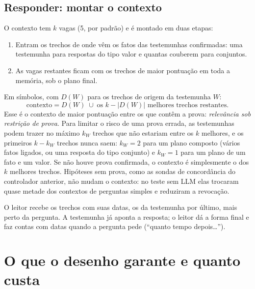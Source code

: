 \documentclass[11pt]{article}
\begin{document}
\subsection{Responder: montar o contexto}

O contexto tem $k$ vagas (5, por padrão) e é montado em duas etapas:
\begin{enumerate}[leftmargin=*,itemsep=1pt]
\item Entram os trechos de onde vêm os fatos das testemunhas confirmadas: uma
  testemunha para respostas do tipo valor e quantas couberem para conjuntos.
\item As vagas restantes ficam com os trechos de maior pontuação em toda a
  memória, sob o plano final.
\end{enumerate}
Em símbolos, com $D(W)$ para os trechos de origem da testemunha $W$:
\begin{equation}
\label{eq:contexto}
\text{contexto}=D(W)\;\cup\;\text{os } k-|D(W)| \text{ melhores trechos restantes}.
\end{equation}
Esse é o contexto de maior pontuação entre os que contêm a prova:
\emph{relevância sob restrição de prova}. Para limitar o risco de uma prova
errada, as testemunhas podem trazer no máximo $k_W$ trechos que não estariam
entre os $k$ melhores, e os primeiros $k-k_W$ trechos nunca saem: $k_W=2$ para
um plano composto (vários fatos ligados, ou uma resposta do tipo conjunto) e
$k_W=1$ para um plano de um fato e um valor. Se não houve prova confirmada, o
contexto é simplesmente o dos $k$ melhores trechos. Hipóteses sem prova, como
as sondas de concordância do controlador anterior, não mudam o contexto: no
teste sem LLM elas trocaram quase metade dos contextos de perguntas simples e
reduziram a revocação.

O leitor recebe os trechos com suas datas, os da testemunha por último, mais
perto da pergunta. A testemunha já aponta a resposta; o leitor dá a forma
final e faz contas com datas quando a pergunta pede (``quanto tempo
depois\ldots'').

\section{O que o desenho garante e quanto custa}
\end{document}

